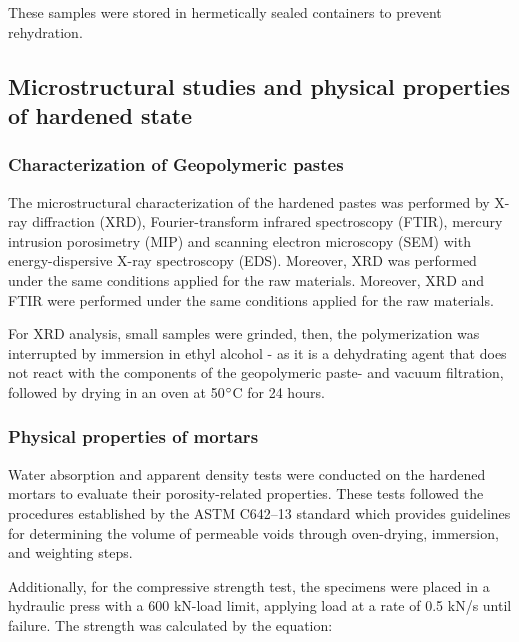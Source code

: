 These samples were stored in hermetically sealed containers to prevent rehydration.

\subsection{Microstructural studies and physical properties of hardened state}
\label{sec:microstructural_studies_physical_properties_hardened_state}

\subsubsection{Characterization of Geopolymeric pastes}
\label{sec:characterization_geopolymeric_pastes}

The microstructural characterization of the hardened pastes was performed by X-ray diffraction (XRD), Fourier-transform infrared spectroscopy (FTIR), mercury intrusion porosimetry (MIP) and scanning electron microscopy (SEM) with energy-dispersive X-ray spectroscopy (EDS). 
Moreover, XRD was performed under the same conditions applied for the raw materials.
Moreover, XRD and FTIR were performed under the same conditions applied for the raw materials.

For XRD analysis, small samples were grinded, then, the polymerization was interrupted by immersion in ethyl alcohol - as it is a dehydrating agent that does not react with the components of the geopolymeric paste- and vacuum filtration, followed by drying in an oven at 50$^{\circ}$C for 24 hours.


\subsubsection{Physical properties of mortars}
\label{sec:physical_properties_mortars}

Water absorption and apparent density tests were conducted on the hardened mortars to evaluate their porosity-related properties. These tests followed the procedures established by the ASTM C642–13 standard \cite{ASTM_C642_2013} which provides guidelines for determining the volume of permeable voids through oven-drying, immersion, and weighting steps. 

Additionally, for the compressive strength test, the specimens were placed in a hydraulic press with  a 600 kN-load limit, applying load at a rate of 0.5 kN/s until failure. The strength was calculated by the equation:

